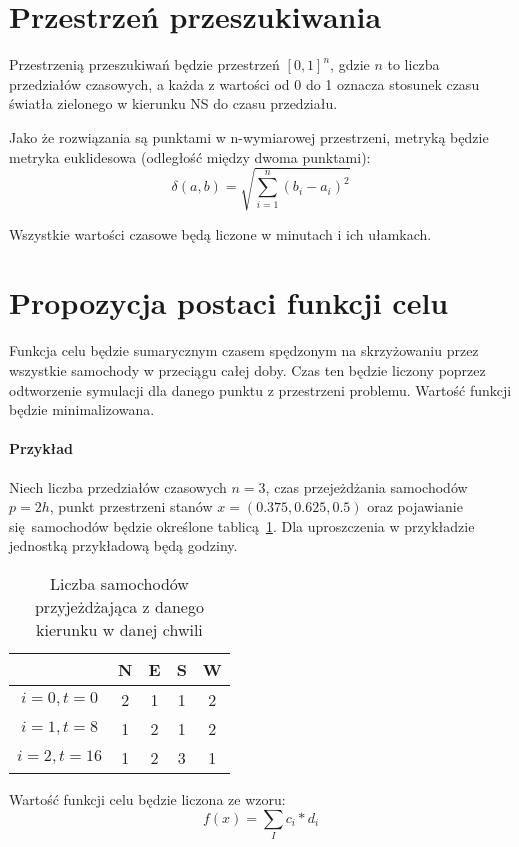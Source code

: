 \documentclass[a4paper]{article}
\begin{document}
\section{Przestrzeń przeszukiwania}
Przestrzenią przeszukiwań będzie przestrzeń $[0, 1]^n$, gdzie $n$ to liczba
przedziałów czasowych, a każda z wartości od 0 do 1 oznacza stosunek czasu światła
zielonego w kierunku NS do czasu przedziału.

\newpage

Jako że rozwiązania są punktami w n-wymiarowej przestrzeni, metryką będzie
metryka euklidesowa (odległość między dwoma punktami):
$$\delta(a, b) = \sqrt{\sum\limits_{i=1}^{n}(b_i - a_i)^2}$$


Wszystkie wartości czasowe będą liczone w minutach i ich ułamkach.

\section{Propozycja postaci funkcji celu}
Funkcja celu będzie sumarycznym czasem spędzonym na skrzyżowaniu przez wszystkie
samochody w przeciągu całej doby. Czas ten będzie liczony poprzez odtworzenie
symulacji dla danego punktu z przestrzeni problemu. Wartość funkcji będzie
minimalizowana.

\paragraph{Przykład} Niech liczba przedziałów czasowych $n=3$, czas
przejeżdżania samochodów $p=2h$, punkt przestrzeni stanów $x=(0.375, 0.625, 0.5)$
oraz pojawianie się samochodów będzie określone tablicą~\ref{tab:example}.
Dla uproszczenia w przykładzie jednostką przykładową będą godziny.

\begin{table}[ht]
    \centering
    \begin{tabular}{| c | c | c | c | c |}
        \hline
         & N & E & S & W \\ \hline
         $i=0, t=0$ & 2 & 1 & 1 & 2\\ \hline
         $i=1, t=8$ & 1 & 2 & 1 & 2\\ \hline
         $i=2, t=16$ & 1 & 2 & 3 & 1\\ \hline
    \end{tabular}
    \caption{Liczba samochodów przyjeżdżająca z danego kierunku w danej chwili\label{tab:example}}
\end{table}

Wartość funkcji celu będzie liczona ze wzoru:
$$f(x) = \sum\limits_{I} c_i * d_i $$
\end{document}
